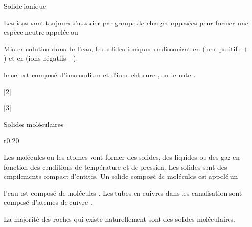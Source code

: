 \begin{doc}{Solide ionique}
  \begin{importants}
    Les ions vont toujours s'associer par groupe de charges opposées pour former une espèce neutre appelée  ou 
  \end{importants}
  
  Mis en solution dans de l'eau, les solides ioniques se dissocient en  (ions positifs $+$) et en  (ions négatifs $-$).
  
  \exemple le sel est composé d'ions sodium  et d'ions chlorure \chlorure, on le note .
\end{doc}

\pasCorrection{\newpage \vspace*{-30pt}}
[2]

[3]



\vspace*{-4pt}
\begin{doc}{Solides moléculaires}
  \begin{wrapfigure}{r}{0.20\linewidth}
    \vspace*{-32pt}
    \centering
  \end{wrapfigure}
  \strut\vspace*{-20pt}
  
  \begin{importants}
    Les molécules ou les atomes vont former des solides, des liquides ou des gaz en fonction des conditions de température et de pression.
    Les solides sont des empilements compact d'entités. Un solide composé de molécules est appelé un 
  \end{importants}
  \exemple* l'eau est composé de molécules .
  Les tubes en cuivres dans les canalisation sont composé d'atomes de cuivre .

  La majorité des roches qui existe naturellement sont des solides moléculaires.
\end{doc}

